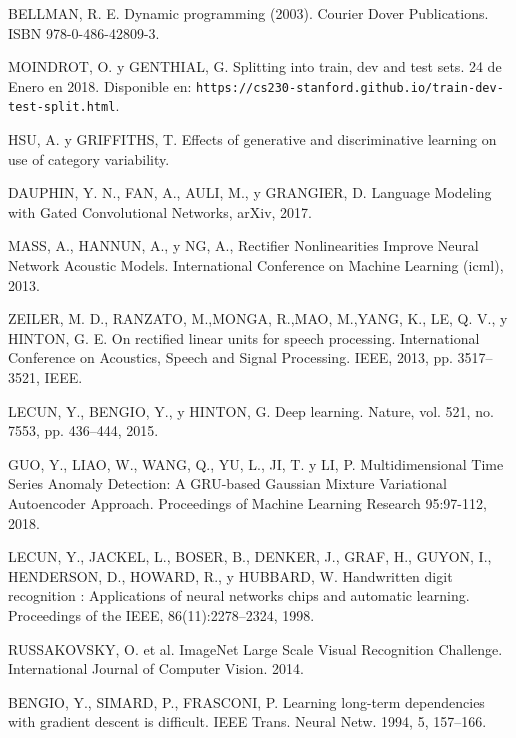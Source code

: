 \begin{thebibliography}{9}
 BELLMAN, R. E. Dynamic programming (2003). Courier Dover Publications. ISBN 978-0-486-42809-3.

 MOINDROT, O. y GENTHIAL, G. Splitting into train, dev and test sets. 24 de Enero en 2018. Disponible en: \texttt{https://cs230-stanford.github.io/train-dev-test-split.html}.

 HSU, A. y GRIFFITHS, T. Effects of generative and discriminative learning on use of category variability.

 DAUPHIN, Y. N., FAN, A., AULI, M., y GRANGIER, D. Language Modeling with Gated Convolutional Networks, arXiv, 2017.

 MASS, A., HANNUN, A., y NG, A., Rectifier Nonlinearities Improve Neural Network Acoustic Models. International Conference on Machine Learning (icml), 2013.

 ZEILER, M. D., RANZATO, M.,MONGA, R.,MAO, M.,YANG, K., LE, Q. V., y HINTON, G. E. On rectified linear units for speech processing. International Conference on Acoustics, Speech and Signal Processing. IEEE, 2013, pp. 3517–3521, IEEE.

 LECUN, Y., BENGIO, Y., y HINTON, G. Deep learning. Nature, vol. 521, no. 7553, pp. 436–444, 2015.


 GUO, Y., LIAO, W., WANG, Q., YU, L., JI, T. y LI, P. Multidimensional Time Series Anomaly Detection: A GRU-based Gaussian Mixture Variational Autoencoder Approach. Proceedings of Machine Learning Research 95:97-112, 2018.

 LECUN, Y., JACKEL, L., BOSER, B., DENKER, J., GRAF, H., GUYON, I., HENDERSON, D., HOWARD, R., y HUBBARD, W. Handwritten digit recognition : Applications of neural networks chips and automatic learning. Proceedings of the IEEE, 86(11):2278–2324, 1998.

 RUSSAKOVSKY, O. et al. ImageNet Large Scale Visual Recognition Challenge. International Journal of Computer Vision. 2014. 

 BENGIO, Y., SIMARD, P., FRASCONI, P. Learning long-term dependencies with gradient descent is difficult. IEEE Trans. Neural Netw. 1994, 5, 157–166.


\end{thebibliography}
